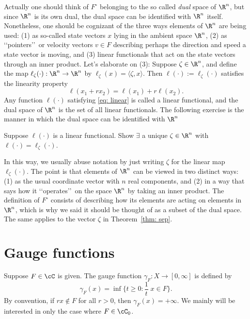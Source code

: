\documentclass[12pt]{article}
\begin{document}
Actually one should think of $F^{\circ}$ belonging to the so called {\em dual} space of $\R^n$, but since $\R^n$ is its own dual, the dual space can be
identified with $\R^n$ itself.  Nonetheless, one should be cognizant of the three ways elements of $\R^n$ are being used: (1) as so-called state vectors $x$ lying in the ambient space $\R^n$, (2) as \lq\lq pointers\rq\rq\ or velocity vectors $v\in F$ describing perhaps the direction and speed a state vector is moving, and (3) linear functionals that act on the state vectors through an inner product.  
Let's elaborate on (3): Suppose $\zeta\in\R^n$, and define the map $\ell_{\zeta}(\cdot):\R^n\to\R^n$ by $\ell_{\zeta}(x)=\langle\zeta,x\rangle$.  Then  $\ell(\cdot):=\ell_{\zeta}(\cdot)$ satisfies the linearity property
\begin{equation}\label{eq: linear}
\ell(x_1+rx_2)=\ell(x_1)+r\ell(x_2).
\end{equation}
Any function $\ell(\cdot)$ satisfying \eqref{eq: linear} is called a linear functional, and the dual space of $\R^n$ is the set of all linear functionals.   
The following exercise is the manner in which the dual space can be identified with $\R^n$ 

{\blue
\begin{exer}
Suppose $\ell(\cdot)$ is a linear functional.  Show $\exists$ a unique $\zeta\in\R^n$ with $\ell(\cdot)=\ell_{\zeta}(\cdot)$.
\end{exer}
}
\noindent
In this way, we usually abuse notation by just writing $\zeta$ for the linear map $\ell_{\zeta}(\cdot)$.  The point is that elements of $\R^n$ can be viewed in two distinct ways: (1) as the usual coordinate vector with $n$ real components, and (2) in a way that says how it \lq\lq operates\rq\rq\ on the space $\R^n$ by taking an inner product.   The definition of $F^{\circ}$ consists of describing how its elements are acting on elements in $\R^n$, which is why we said it should be thought of as a subset of the dual space.  The same applies to the vector $\zeta$ in Theorem~\ref{thm: sep}.

\section{Gauge functions}
Suppose $F\in\cC$ is given.  The gauge function $\gamma_F:X\to
[0,\infty]$ is defined by
\[
\gamma_F (x)=\inf\biggl\{t\geq 0:\frac{1}{t}\;x\in F\biggr\}.
\]
By convention, if $rx\notin F$ for all $r>0$, then
$\gamma_F(x)=+\infty$.
We mainly will be interested in only the case where $F\in\cC_0$.
\end{document}
